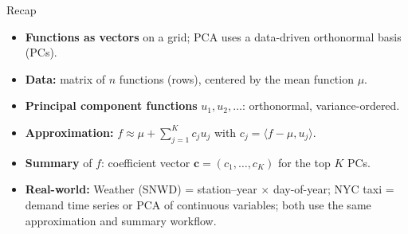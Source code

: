 \documentclass[aspectratio=169]{beamer}
\begin{document}
\begin{frame}{Recap}
  \small
  \begin{itemize}
    \item \textbf{Functions as vectors} on a grid; PCA uses a data-driven orthonormal basis (PCs).
    \item \textbf{Data:} matrix of $n$ functions (rows), centered by the mean function $\mu$.
    \item \textbf{Principal component functions} $u_1, u_2, \ldots$: orthonormal, variance-ordered.
    \item \textbf{Approximation:} $f \approx \mu + \sum_{j=1}^K c_j u_j$ with $c_j = \langle f - \mu, u_j \rangle$.
    \item \textbf{Summary} of $f$: coefficient vector $\mathbf{c} = (c_1, \ldots, c_K)$ for the top $K$ PCs.
    \item \textbf{Real-world:} Weather (SNWD) = station--year $\times$ day-of-year; NYC taxi = demand time series or PCA of continuous variables; both use the same approximation and summary workflow.
  \end{itemize}
\end{frame}
\end{document}

